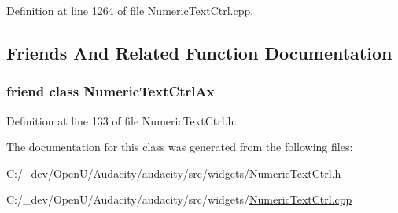 Definition at line 1264 of file Numeric\+Text\+Ctrl.\+cpp.



\subsection{Friends And Related Function Documentation}
\subsubsection[{\texorpdfstring{Numeric\+Text\+Ctrl\+Ax}{NumericTextCtrlAx}}]{\setlength{\rightskip}{0pt plus 5cm}friend class {\bf Numeric\+Text\+Ctrl\+Ax}\hspace{0.3cm}{\ttfamily [friend]}}\hypertarget{class_numeric_text_ctrl_a9e42609bb05ebc3b661b10cf8606b6e8}{}\label{class_numeric_text_ctrl_a9e42609bb05ebc3b661b10cf8606b6e8}


Definition at line 133 of file Numeric\+Text\+Ctrl.\+h.



The documentation for this class was generated from the following files\+:\begin{DoxyCompactItemize}
\item 
C\+:/\+\_\+dev/\+Open\+U/\+Audacity/audacity/src/widgets/\hyperlink{_numeric_text_ctrl_8h}{Numeric\+Text\+Ctrl.\+h}\item 
C\+:/\+\_\+dev/\+Open\+U/\+Audacity/audacity/src/widgets/\hyperlink{_numeric_text_ctrl_8cpp}{Numeric\+Text\+Ctrl.\+cpp}\end{DoxyCompactItemize}
